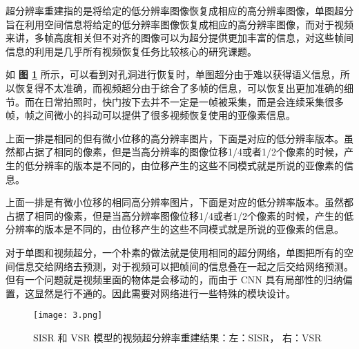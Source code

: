 
超分辨率重建指的是将给定的低分辨率图像恢复成相应的高分辨率图像，单图超分旨在利用空间信息将给定的低分辨率图像恢复成相应的高分辨率图像，而对于视频来讲，多帧高度相关但不对齐的图像可以为超分提供更加丰富的信息，对这些帧间信息的利用是几乎所有视频恢复任务比较核心的研究课题。

如 \textbf{图 \ref{fig:fig2}} 所示，可以看到对孔洞进行恢复时，单图超分由于难以获得语义信息，所以恢复得不太准确，而视频超分由于综合了多帧的信息，可以恢复出更加准确的细节。而在日常拍照时，快门按下去并不一定是一帧被采集，而是会连续采集很多帧，帧之间微小的抖动可以提供了很多视频恢复使用的亚像素信息。


上面一排是相同的但有微小位移的高分辨率图片，下面是对应的低分辨率版本。虽然都占据了相同的像素，但是当高分辨率的图像位移1/4或者1/2个像素的时候，产生的低分辨率的版本是不同的，由位移产生的这些不同模式就是所说的亚像素的信息。

上面一排是有微小位移的相同高分辨率图片，下面是对应的低分辨率版本。虽然都占据了相同的像素，但是当高分辨率图像位移1/4或者1/2个像素的时候，产生的低分辨率的版本是不同的，由位移产生的这些不同模式就是所说的亚像素的信息。

对于单图和视频超分，一个朴素的做法就是使用相同的超分网络，单图把所有的空间信息交给网络去预测，对于视频可以把帧间的信息叠在一起之后交给网络预测。但有一个问题就是视频里面的物体是会移动的，而由于 CNN 具有局部性的归纳偏置，这显然是行不通的。因此需要对网络进行一些特殊的模块设计。

\begin{figure}[!tbp]
	\centering
	\texttt{[image: 3.png]}
	\caption{SISR 和 VSR 模型的视频超分辨率重建结果：左：SISR， 右：VSR}
	\label{fig:fig2}
\end{figure}
